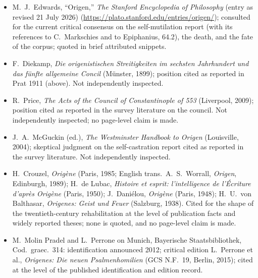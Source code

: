 \begin{itemize}
\item M.~J.~Edwards, ``Origen,'' \textit{The Stanford Encyclopedia of
Philosophy} (entry as revised 21 July 2026)
(\url{https://plato.stanford.edu/entries/origen/}); consulted for the
current critical consensus on the self-mutilation report (with its
references to C.~Markschies and to Epiphanius,  64.2), the
death, and the fate of the corpus; quoted in brief attributed snippets.
\item F.~Diekamp, \textit{Die origenistischen Streitigkeiten im sechsten
Jahrhundert und das f\"unfte allgemeine Concil} (M\"unster, 1899); position
cited as reported in Prat 1911 (above). Not independently inspected.
\item R.~Price, \textit{The Acts of the Council of Constantinople of 553}
(Liverpool, 2009); position cited as reported in the survey literature on
the council. Not independently inspected; no page-level claim is made.
\item J.~A.~McGuckin (ed.), \textit{The Westminster Handbook to Origen}
(Louisville, 2004); skeptical judgment on the self-castration report cited
as reported in the survey literature. Not independently inspected.
\item H.~Crouzel, \textit{Orig\`ene} (Paris, 1985; English trans.\
A.~S.~Worrall, \textit{Origen}, Edinburgh, 1989); H.~de Lubac,
\textit{Histoire et esprit: l'intelligence de l'\'Ecriture d'apr\`es
Orig\`ene} (Paris, 1950); J.~Dani\'elou, \textit{Orig\`ene} (Paris, 1948);
H.~U.~von Balthasar, \textit{Origenes: Geist und Feuer} (Salzburg, 1938).
Cited for the shape of the twentieth-century rehabilitation at the level
of publication facts and widely reported theses; none is quoted, and no
page-level claim is made.
\item M.~Molin Pradel and L.~Perrone on Munich, Bayerische
Staatsbibliothek, Cod.\ graec.\ 314: identification announced 2012;
critical edition L.~Perrone et al., \textit{Origenes: Die neuen
Psalmenhomilien} (GCS N.F.~19, Berlin, 2015); cited at the level of the
published identification and edition record.
\end{itemize}

\endgroup
